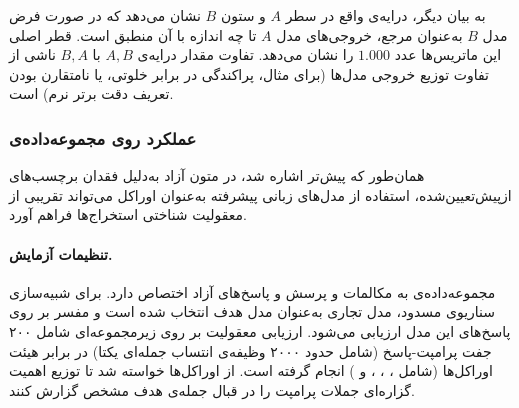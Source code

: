 به بیان دیگر، درایه‌ی واقع در سطر $A$ و ستون $B$ نشان می‌دهد که در صورت فرض مدل $B$ به‌عنوان مرجع، خروجی‌های مدل $A$ تا چه اندازه با آن منطبق است. قطر اصلی این ماتریس‌ها عدد $1.000$ را نشان می‌دهد. تفاوت مقدار درایه‌ی $A,B$ با $B,A$ ناشی از تفاوت توزیع خروجی مدل‌ها (برای مثال، پراکندگی در برابر خلوتی، یا نامتقارن بودن تعریف دقت برتر نرم) است.


\subsubsection{عملکرد روی مجموعه‌داده‌ی }\label{sec:5-3-1-1}

همان‌طور که پیش‌تر اشاره شد، در متون آزاد به‌دلیل فقدان برچسب‌های ازپیش‌تعیین‌شده، استفاده از مدل‌های زبانی پیشرفته به‌عنوان اوراکل می‌تواند تقریبی از معقولیت شناختی استخراج‌ها فراهم آورد.

\paragraph{تنظیمات آزمایش.}
مجموعه‌داده‌ی  به مکالمات و پرسش و پاسخ‌های آزاد اختصاص دارد. برای شبیه‌سازی سناریوی مسدود، مدل تجاری  به‌عنوان مدل هدف انتخاب شده است و مفسر  بر روی پاسخ‌های این مدل ارزیابی می‌شود. ارزیابی معقولیت بر روی زیرمجموعه‌ای شامل ۲۰۰ جفت پرامپت-پاسخ (شامل حدود ۲۰۰۰ وظیفه‌ی انتساب جمله‌ای یکتا) در برابر هیئت اوراکل‌ها (شامل ، ، ،  و ) انجام گرفته است. از اوراکل‌ها خواسته شد تا توزیع اهمیت گزاره‌ای جملات پرامپت را در قبال جمله‌ی هدف مشخص گزارش کنند.

